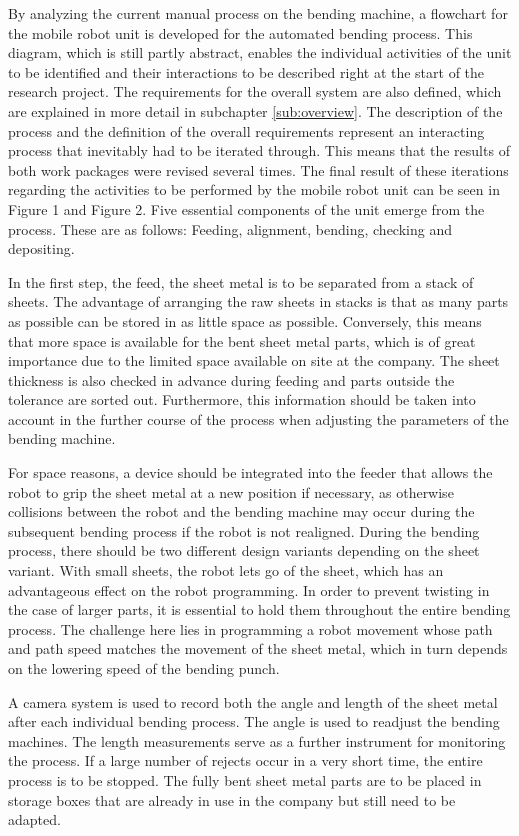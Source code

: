 By analyzing the current manual process on the bending machine, a flowchart for the mobile robot unit
is developed for the automated bending process. This
diagram, which is still partly abstract, enables the individual activities of the unit to be identified and
their interactions to be described right at the start of the research project. The requirements for the
overall system are also defined, which are explained in more detail
in subchapter \ref{sub:overview}. The description of the process and the definition of the overall requirements
represent an interacting process that inevitably had to be iterated through. This means that the results
of both work packages were revised several times. The final result of these iterations regarding the
activities to be performed by the mobile robot unit can be seen in Figure 1 and Figure 2. Five essential
components of the unit emerge from the process. These are as follows: Feeding, alignment, bending,
checking and depositing.

In the first step, the feed, the sheet metal is to be separated from a stack of sheets. The advantage of
arranging the raw sheets in stacks is that as many parts as possible can be stored in as little space as
possible. Conversely, this means that more space is available for the bent sheet metal parts, which is
of great importance due to the limited space available on site at the company. The sheet thickness is
also checked in advance during feeding and parts outside the tolerance are sorted out. Furthermore,
this information should be taken into account in the further course of the process when adjusting the
parameters of the bending machine.

For space reasons, a device should be integrated into the feeder that allows the robot to grip the sheet
metal at a new position if necessary, as otherwise collisions between the robot and the bending
machine may occur during the subsequent bending process if the robot is not realigned.
During the bending process, there should be two different design variants depending on the sheet
variant. With small sheets, the robot lets go of the sheet, which has an advantageous effect on the
robot programming. In order to prevent twisting in the case of larger parts, it is essential to hold them
throughout the entire bending process. The challenge here lies in programming a robot movement
whose path and path speed matches the movement of the sheet metal, which in turn depends on the
lowering speed of the bending punch.

A camera system is used to record both the angle and length of the sheet metal after each individual
bending process. The angle is used to readjust the bending machines. The length measurements
serve as a further instrument for monitoring the process. If a large number of rejects occur in a very
short time, the entire process is to be stopped.
The fully bent sheet metal parts are to be placed in storage boxes that are already in use in the
company but still need to be adapted.


